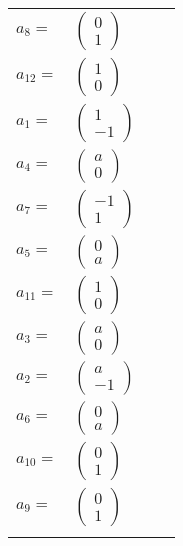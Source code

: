 \documentclass[1p]{elsarticle_modified}
\theoremstyle{definition}
\begin{document}
\begin{tabular}{m{7pt} m{180pt} m{7pt} m{180pt} }
\flushright $a_{8}=$&$\begin{pmatrix}0\\1\end{pmatrix}$ \\
\flushright $a_{12}=$&$\begin{pmatrix}1\\0\end{pmatrix}$ \\
\flushright $a_{1}=$&$\begin{pmatrix}1\\-1\end{pmatrix}$ \\
\flushright $a_{4}=$&$\begin{pmatrix}a\\0\end{pmatrix}$ \\
\flushright $a_{7}=$&$\begin{pmatrix}-1\\1\end{pmatrix}$ \\
\flushright $a_{5}=$&$\begin{pmatrix}0\\a\end{pmatrix}$ \\
\flushright $a_{11}=$&$\begin{pmatrix}1\\0\end{pmatrix}$ \\
\flushright $a_{3}=$&$\begin{pmatrix}a\\0\end{pmatrix}$ \\
\flushright $a_{2}=$&$\begin{pmatrix}a\\-1\end{pmatrix}$ \\
\flushright $a_{6}=$&$\begin{pmatrix}0\\a\end{pmatrix}$ \\
\flushright $a_{10}=$&$\begin{pmatrix}0\\1\end{pmatrix}$ \\
\flushright $a_{9}=$&$\begin{pmatrix}0\\1\end{pmatrix}$\\&\end{tabular}
\end{document}
